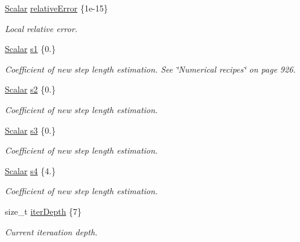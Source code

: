 \begin{DoxyCompactItemize}
\mbox{\hyperlink{class_b_s_iterator_a7857f8ff9032955ea4dcc22cd18ca7a1}{Scalar}} \mbox{\hyperlink{class_b_s_iterator_abce71b7bac10363f7772dc848f8722b6}{relative\+Error}} \{1e-\/15\}
\begin{DoxyCompactList}\small\item\em Local relative error. \end{DoxyCompactList}\item 
\mbox{\hyperlink{class_b_s_iterator_a7857f8ff9032955ea4dcc22cd18ca7a1}{Scalar}} \mbox{\hyperlink{class_b_s_iterator_a942f85e00c28ef1990d1dfbed69c9e13}{s1}} \{0.\}
\begin{DoxyCompactList}\small\item\em Coefficient of new step length estimation. See \char`\"{}\+Numerical recipes\char`\"{} on page 926. \end{DoxyCompactList}\item 
\mbox{\hyperlink{class_b_s_iterator_a7857f8ff9032955ea4dcc22cd18ca7a1}{Scalar}} \mbox{\hyperlink{class_b_s_iterator_ad1cdde25df6bca7a456c1908be54065f}{s2}} \{0.\}
\begin{DoxyCompactList}\small\item\em Coefficient of new step length estimation. \end{DoxyCompactList}\item 
\mbox{\hyperlink{class_b_s_iterator_a7857f8ff9032955ea4dcc22cd18ca7a1}{Scalar}} \mbox{\hyperlink{class_b_s_iterator_a10ea0bb96f7971e9c477daef1fda6e16}{s3}} \{0.\}
\begin{DoxyCompactList}\small\item\em Coefficient of new step length estimation. \end{DoxyCompactList}\item 
\mbox{\hyperlink{class_b_s_iterator_a7857f8ff9032955ea4dcc22cd18ca7a1}{Scalar}} \mbox{\hyperlink{class_b_s_iterator_a5b3bbb2d988a5d91030060508e3b4f66}{s4}} \{4.\}
\begin{DoxyCompactList}\small\item\em Coefficient of new step length estimation. \end{DoxyCompactList}\item 
size\+\_\+t \mbox{\hyperlink{class_b_s_iterator_aa073f847cc5855f727c8f326f539a5f0}{iter\+Depth}} \{7\}
\begin{DoxyCompactList}\small\item\em Current iteraation depth. \end{DoxyCompactList}\end{DoxyCompactItemize}
